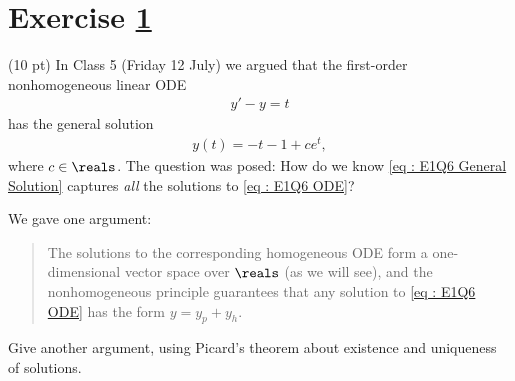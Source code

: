 %
%
%
%


\section{Exercise \ref{sec : Math211 Summer2019 Exam1 Q6}}
\label{sec : Math211 Summer2019 Exam1 Q6}

(10 pt) In Class 5 (Friday 12 July) we argued that the first-order nonhomogeneous linear ODE
\begin{align}
y' - y
=
t%
\label{eq : E1Q6 ODE}
\end{align}
has the general solution
\begin{align}
y(t)
=
-t - 1 + c e^{t},%
\label{eq : E1Q6 General Solution}
\end{align}
where $c \in \reals$. The question was posed: How do we know \eqref{eq : E1Q6 General Solution} captures \emph{all} the solutions to \eqref{eq : E1Q6 ODE}?

We gave one argument:
\begin{quote}
The solutions to the corresponding homogeneous ODE form a one-dimensional vector space over $\reals$ (as we will see), and the nonhomogeneous principle guarantees that any solution to \eqref{eq : E1Q6 ODE} has the form $y = y_{p} + y_{h}$.
\end{quote}
Give another argument, using Picard's theorem about existence and uniqueness of solutions. 

